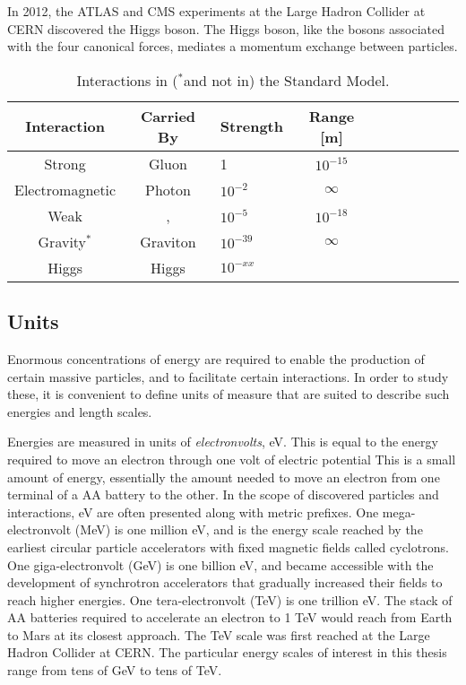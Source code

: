 In 2012, the ATLAS and CMS experiments at the Large Hadron Collider at CERN discovered the Higgs boson.
The Higgs boson, like the bosons associated with the four canonical forces, mediates a momentum exchange between particles.

\begin{table}[htp]
\begin{center}
\caption{Interactions in ($^*$and not in) the Standard Model. \cite{robinson}}
{\footnotesize
\begin{tabular}{c c l c c c c c c c}
\toprule
Interaction      & Carried By &  Strength   & Range [m]  \\
\midrule
Strong           & Gluon      &  1          & $10^{-15}$ \\
Electromagnetic  & Photon     &  $10^{-2}$  & $\infty$   \\
Weak             & \W, \Z     &  $10^{-5}$  & $10^{-18}$ \\
Gravity$^*$      & Graviton   &  $10^{-39}$ & $\infty$   \\
Higgs            & Higgs      &  $10^{-xx}$ &    \\
\bottomrule      
\end{tabular}
}
\label{tab:forces}
\end{center}
\end{table}

\subsection{Units}

Enormous concentrations of energy are required to enable the production of certain massive particles, and to facilitate certain interactions.
In order to study these, it is convenient to define units of measure that are suited to describe such energies and length scales.

Energies are measured in units of \emph{electronvolts}, eV.
This is equal to the energy required to move an electron through one volt of electric potential
This is a small amount of energy, essentially the amount needed to move an electron from one terminal of a AA battery to the other.
In the scope of discovered particles and interactions, eV are often presented along with metric prefixes.
One mega-electronvolt (MeV) is one million eV, and is the energy scale reached by the earliest circular particle accelerators with fixed magnetic fields called cyclotrons. 
One giga-electronvolt (GeV) is one billion eV, and became accessible with the development of synchrotron accelerators that gradually increased their fields to reach higher energies.
One tera-electronvolt (TeV) is one trillion eV.
The stack of AA batteries required to accelerate an electron to 1 TeV would reach from Earth to Mars at its closest approach.
The TeV scale was first reached at the Large Hadron Collider at CERN.
The particular energy scales of interest in this thesis range from tens of GeV to tens of TeV.

